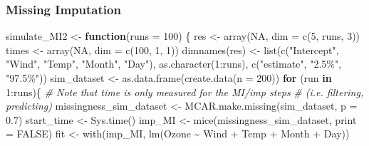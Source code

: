 \documentclass[
]{article}
\newenvironment{Shaded}{\begin{snugshade}}{\end{snugshade}}
\newcommand{\AttributeTok}[1]{\textcolor[rgb]{0.77,0.63,0.00}{#1}}
\newcommand{\CommentTok}[1]{\textcolor[rgb]{0.56,0.35,0.01}{\textit{#1}}}
\newcommand{\ConstantTok}[1]{\textcolor[rgb]{0.00,0.00,0.00}{#1}}
\newcommand{\ControlFlowTok}[1]{\textcolor[rgb]{0.13,0.29,0.53}{\textbf{#1}}}
\newcommand{\DecValTok}[1]{\textcolor[rgb]{0.00,0.00,0.81}{#1}}
\newcommand{\FloatTok}[1]{\textcolor[rgb]{0.00,0.00,0.81}{#1}}
\newcommand{\FunctionTok}[1]{\textcolor[rgb]{0.00,0.00,0.00}{#1}}
\newcommand{\NormalTok}[1]{#1}
\newcommand{\OtherTok}[1]{\textcolor[rgb]{0.56,0.35,0.01}{#1}}
\newcommand{\SpecialCharTok}[1]{\textcolor[rgb]{0.00,0.00,0.00}{#1}}
\newcommand{\StringTok}[1]{\textcolor[rgb]{0.31,0.60,0.02}{#1}}
\begin{document}
\hypertarget{missing-imputation}{%
\subsubsection{Missing Imputation}\label{missing-imputation}}

\begin{Shaded}
\begin{Highlighting}[]
\NormalTok{simulate\_MI2 }\OtherTok{\textless{}{-}} \ControlFlowTok{function}\NormalTok{(}\AttributeTok{runs =} \DecValTok{100}\NormalTok{) \{}
\NormalTok{  res }\OtherTok{\textless{}{-}} \FunctionTok{array}\NormalTok{(}\ConstantTok{NA}\NormalTok{, }\AttributeTok{dim =} \FunctionTok{c}\NormalTok{(}\DecValTok{5}\NormalTok{, runs, }\DecValTok{3}\NormalTok{))}
\NormalTok{  times }\OtherTok{\textless{}{-}} \FunctionTok{array}\NormalTok{(}\ConstantTok{NA}\NormalTok{, }\AttributeTok{dim =} \FunctionTok{c}\NormalTok{(}\DecValTok{100}\NormalTok{, }\DecValTok{1}\NormalTok{, }\DecValTok{1}\NormalTok{))}
  \FunctionTok{dimnames}\NormalTok{(res) }\OtherTok{\textless{}{-}} \FunctionTok{list}\NormalTok{(}\FunctionTok{c}\NormalTok{(}\StringTok{"Intercept"}\NormalTok{, }\StringTok{"Wind"}\NormalTok{, }\StringTok{"Temp"}\NormalTok{, }\StringTok{"Month"}\NormalTok{, }\StringTok{"Day"}\NormalTok{),}
                        \FunctionTok{as.character}\NormalTok{(}\DecValTok{1}\SpecialCharTok{:}\NormalTok{runs), }\FunctionTok{c}\NormalTok{(}\StringTok{"estimate"}\NormalTok{, }\StringTok{"2.5\%"}\NormalTok{, }\StringTok{"97.5\%"}\NormalTok{))}
\NormalTok{  sim\_dataset }\OtherTok{\textless{}{-}} \FunctionTok{as.data.frame}\NormalTok{(}\FunctionTok{create.data}\NormalTok{(}\AttributeTok{n =} \DecValTok{200}\NormalTok{))}
  \ControlFlowTok{for}\NormalTok{ (run }\ControlFlowTok{in} \DecValTok{1}\SpecialCharTok{:}\NormalTok{runs)\{}
      \CommentTok{\# Note that time is only measured for the MI/imp steps }
      \CommentTok{\# (i.e. filtering, predicting)}
\NormalTok{    missingness\_sim\_dataset }\OtherTok{\textless{}{-}} \FunctionTok{MCAR.make.missing}\NormalTok{(sim\_dataset, }\AttributeTok{p =} \FloatTok{0.7}\NormalTok{)}
\NormalTok{    start\_time }\OtherTok{\textless{}{-}} \FunctionTok{Sys.time}\NormalTok{()}
\NormalTok{    imp\_MI }\OtherTok{\textless{}{-}} \FunctionTok{mice}\NormalTok{(missingness\_sim\_dataset, }\AttributeTok{print =} \ConstantTok{FALSE}\NormalTok{)}
\NormalTok{    fit }\OtherTok{\textless{}{-}} \FunctionTok{with}\NormalTok{(imp\_MI, }\FunctionTok{lm}\NormalTok{(Ozone }\SpecialCharTok{\textasciitilde{}}\NormalTok{ Wind }\SpecialCharTok{+}\NormalTok{ Temp }\SpecialCharTok{+}\NormalTok{ Month }\SpecialCharTok{+}\NormalTok{ Day))}

\end{Highlighting}
\end{Shaded}
\end{document}
